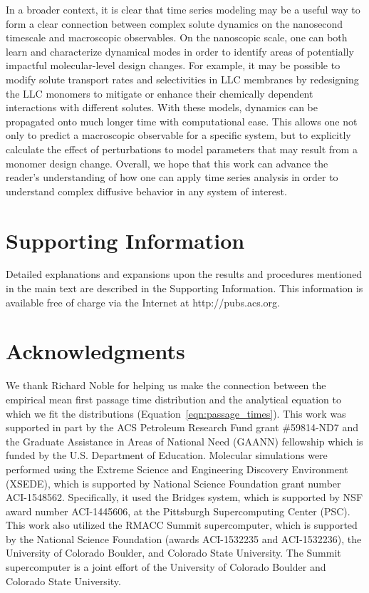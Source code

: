 \documentclass[journal=jctcce,manuscript=article]{achemso}
\begin{document}
  In a broader context, it is clear that time series modeling may be a useful way
  to form a clear connection between complex solute dynamics on the nanosecond 
  timescale and macroscopic observables. On the nanoscopic scale, one can both 
  learn and characterize dynamical modes in order to identify areas of potentially
  impactful molecular-level design changes. For example, it may be possible to 
  modify solute transport rates and selectivities in LLC membranes by redesigning 
  the LLC monomers to mitigate or enhance their chemically dependent interactions
  with different solutes. With these models, dynamics can be propagated onto much 
  longer time with computational ease. This allows one not only to predict a 
  macroscopic observable for a specific system, but to explicitly calculate the 
  effect of perturbations to model parameters that may result from a monomer 
  design change. Overall, we hope that this work can advance the reader's 
  understanding of how one can apply time series analysis in order to understand 
  complex diffusive behavior in any system of interest.
  
  \section*{Supporting Information}

  Detailed explanations and expansions upon the results and procedures
  mentioned in the main text are described in the Supporting Information. This
  information is available free of charge via the Internet at
  http://pubs.acs.org.

  \section*{Acknowledgments}
  
  We thank Richard Noble for helping us make the connection between the empirical 
  mean first passage time distribution and the analytical equation to which we fit
  the distributions (Equation~\ref{eqn:passage_times}).
  This work was supported in part by the ACS Petroleum Research Fund grant
  \#59814-ND7 and the Graduate Assistance in Areas of National Need (GAANN)
  fellowship which is funded by the U.S. Department of Education.  Molecular
  simulations were performed using the Extreme Science and Engineering
  Discovery Environment (XSEDE), which is supported by National Science
  Foundation grant number ACI-1548562. Specifically, it used the Bridges
  system, which is supported by NSF award number ACI-1445606, at the Pittsburgh
  Supercomputing Center (PSC). This work also utilized the RMACC Summit
  supercomputer, which is supported by the National Science Foundation (awards
  ACI-1532235 and ACI-1532236), the University of Colorado Boulder, and
  Colorado State University. The Summit supercomputer is a joint effort of the
  University of Colorado Boulder and Colorado State University.
\end{document}
